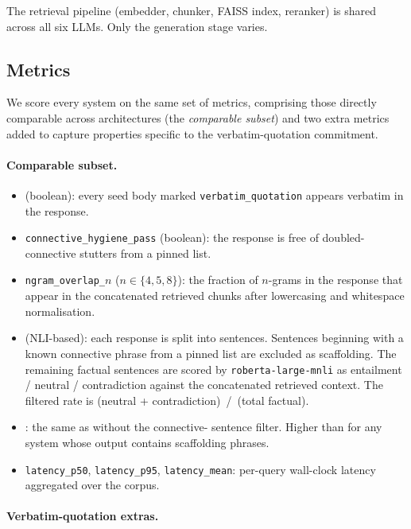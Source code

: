 The retrieval pipeline (embedder, chunker, FAISS index, reranker)
is shared across all six LLMs. Only the generation stage varies.

\subsection{Metrics}
\label{sec:metrics}

We score every system on the same set of metrics, comprising
those directly comparable across architectures (the
\emph{comparable subset}) and two extra metrics added to capture
properties specific to the verbatim-quotation commitment.

\paragraph{Comparable subset.}

\begin{itemize}
    \item \verbpass{} (boolean): every seed body marked
    \texttt{verbatim\_quotation} appears verbatim in the
    response.
    \item \texttt{connective\_hygiene\_pass} (boolean): the
    response is free of doubled-connective stutters from a
    pinned list.
    \item \texttt{ngram\_overlap\_$n$} ($n \in \{4, 5, 8\}$): the
    fraction of $n$-grams in the response that appear in the
    concatenated retrieved chunks after lowercasing and
    whitespace normalisation.
    \item \unsupf{} (NLI-based): each response is split into
    sentences. Sentences beginning with a known connective
    phrase from a pinned list are excluded as scaffolding. The
    remaining factual sentences are scored by
    \texttt{roberta-large-mnli} as entailment / neutral /
    contradiction against the concatenated retrieved context.
    The filtered rate is (neutral + contradiction)~/~(total
    factual).
    \item \unsupr{}: the same as \unsupf{} without the connective-
    sentence filter. Higher than \unsupf{} for any system whose
    output contains scaffolding phrases.
    \item \texttt{latency\_p50}, \texttt{latency\_p95},
    \texttt{latency\_mean}: per-query wall-clock latency
    aggregated over the corpus.
\end{itemize}

\paragraph{Verbatim-quotation extras.}

